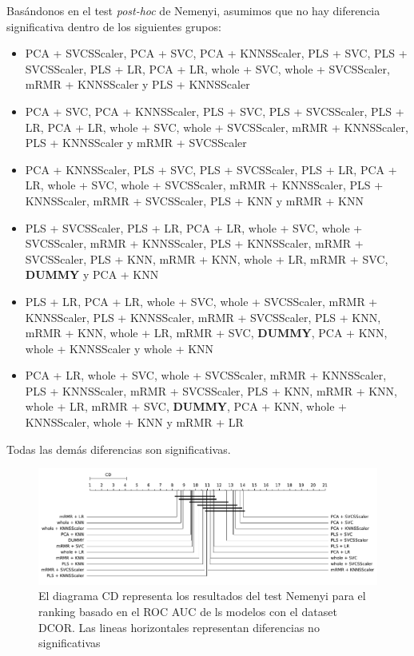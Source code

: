 \documentclass[a4paper,oneside,11pt,leqno]{article}
\begin{document}
	Basándonos en el test \textit{post-hoc} de Nemenyi, asumimos que no hay diferencia significativa dentro de los siguientes grupos:
	
	\begin{itemize}
		\item PCA + SVCSScaler, PCA + SVC, PCA + KNNSScaler, PLS + SVC, PLS + SVCSScaler, PLS + LR, PCA + LR, whole + SVC, whole + SVCSScaler, mRMR + KNNSScaler y PLS + KNNSScaler
		
		\item  PCA + SVC, PCA + KNNSScaler, PLS + SVC, PLS + SVCSScaler, PLS + LR, PCA + LR, whole + SVC, whole + SVCSScaler, mRMR + KNNSScaler, PLS + KNNSScaler y mRMR + SVCSScaler
		
		\item PCA + KNNSScaler, PLS + SVC, PLS + SVCSScaler, PLS + LR, PCA + LR, whole + SVC, whole + SVCSScaler, mRMR + KNNSScaler, PLS + KNNSScaler, mRMR + SVCSScaler, PLS + KNN y mRMR + KNN
		
		\item PLS + SVCSScaler, PLS + LR, PCA + LR, whole + SVC, whole + SVCSScaler, mRMR + KNNSScaler, PLS + KNNSScaler, mRMR + SVCSScaler, PLS + KNN, mRMR + KNN, whole + LR, mRMR + SVC,  \textbf{DUMMY} y PCA + KNN
		
		\item PLS + LR, PCA + LR, whole + SVC, whole + SVCSScaler, mRMR + KNNSScaler, PLS + KNNSScaler, mRMR + SVCSScaler, PLS + KNN, mRMR + KNN, whole + LR, mRMR + SVC,  \textbf{DUMMY}, PCA + KNN, whole + KNNSScaler y whole + KNN
		
		
		\item   PCA + LR, whole + SVC, whole + SVCSScaler, mRMR + KNNSScaler, PLS + KNNSScaler, mRMR + SVCSScaler, PLS + KNN, mRMR + KNN, whole + LR, mRMR + SVC,  \textbf{DUMMY}, PCA + KNN, whole + KNNSScaler, whole + KNN y mRMR + LR  
	\end{itemize}
	
	Todas las demás diferencias son significativas.
	
	\begin{figure}[h]
		\includegraphics[width=\linewidth]{stat_results_dcor.pdf}
		\caption{El diagrama CD representa los resultados del test Nemenyi para el ranking basado en el ROC AUC de ls modelos con el dataset DCOR. Las lineas horizontales representan diferencias no significativas}
		\label{fig:stats_fig_dcor}
	\end{figure}
	
\end{document}
